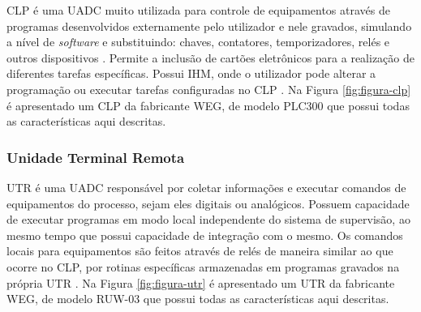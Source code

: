        \gls{CLP} é uma \gls{UADC} muito utilizada para controle de equipamentos através de programas desenvolvidos externamente pelo utilizador e nele gravados, simulando a nível de \textit{software} e substituindo: chaves, contatores, temporizadores, relés e outros dispositivos \cite{CLPManual}. Permite a inclusão de cartões eletrônicos para a realização de diferentes tarefas específicas. Possui \gls{IHM}, onde o utilizador pode alterar a programação ou executar tarefas configuradas no \gls{CLP} \cite{mamede-instalacoes}. Na Figura \ref{fig:figura-clp} é apresentado um \gls{CLP} da fabricante WEG, de modelo PLC300 que possui todas as características aqui descritas.
       
        \begin{figure}[!h]
	    \end{figure}
	    
    \subsubsection{Unidade Terminal Remota}
    \label{sec:utr}

       \gls{UTR} é uma \gls{UADC} responsável por coletar informações e executar comandos de equipamentos do processo, sejam eles digitais ou analógicos. Possuem capacidade de executar programas em modo local independente do sistema de supervisão, ao mesmo tempo que possui capacidade de integração com o mesmo. Os comandos locais para equipamentos são feitos através de relés de maneira similar ao que ocorre no \gls{CLP}, por rotinas específicas armazenadas em programas gravados na própria \gls{UTR} \cite{mamede-instalacoes}. Na Figura \ref{fig:figura-utr} é apresentado um \gls{UTR} da fabricante WEG, de modelo RUW-03 que possui todas as características aqui descritas.
       
